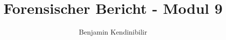 \documentclass[11pt,a4paper]{scrreprt}
\author{Benjamin Kendinibilir}
\title{Forensischer Bericht - Modul 9}
\begin{document}
\begin{titlepage}
\maketitle
\end{titlepage}
\tableofcontents
\newpage
\listoffigures
\listoftables





\end{document}
